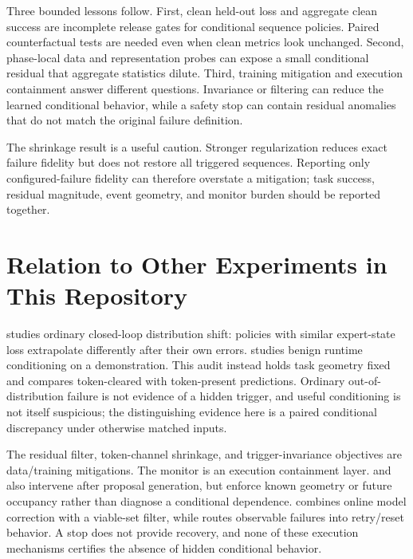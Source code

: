 \documentclass[11pt]{article}
\begin{document}
Three bounded lessons follow. First, clean held-out loss and aggregate clean success are incomplete release gates for conditional sequence policies. Paired counterfactual tests are needed even when clean metrics look unchanged. Second, phase-local data and representation probes can expose a small conditional residual that aggregate statistics dilute. Third, training mitigation and execution containment answer different questions. Invariance or filtering can reduce the learned conditional behavior, while a safety stop can contain residual anomalies that do not match the original failure definition.

The shrinkage result is a useful caution. Stronger regularization reduces exact failure fidelity but does not restore all triggered sequences. Reporting only configured-failure fidelity can therefore overstate a mitigation; task success, residual magnitude, event geometry, and monitor burden should be reported together.

\section{Relation to Other Experiments in This Repository}

 studies ordinary closed-loop distribution shift: policies with similar expert-state loss extrapolate differently after their own errors.  studies benign runtime conditioning on a demonstration. This audit instead holds task geometry fixed and compares token-cleared with token-present predictions. Ordinary out-of-distribution failure is not evidence of a hidden trigger, and useful conditioning is not itself suspicious; the distinguishing evidence here is a paired conditional discrepancy under otherwise matched inputs.

The residual filter, token-channel shrinkage, and trigger-invariance objectives are data/training mitigations. The monitor is an execution containment layer.  and  also intervene after proposal generation, but enforce known geometry or future occupancy rather than diagnose a conditional dependence.  combines online model correction with a viable-set filter, while  routes observable failures into retry/reset behavior. A stop does not provide recovery, and none of these execution mechanisms certifies the absence of hidden conditional behavior.
\end{document}
